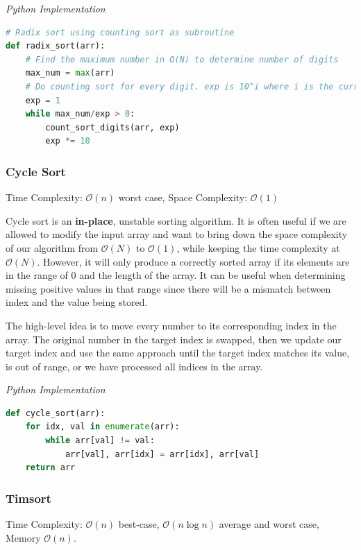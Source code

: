 \documentclass{article}
\newcommand{\bigO}{\mathcal{O}}
\begin{document}
\vspace{8pt} \emph{Python Implementation}
\begin{lstlisting}[language=Python]
# Radix sort using counting sort as subroutine
def radix_sort(arr): 
    # Find the maximum number in O(N) to determine number of digits
    max_num = max(arr) 
    # Do counting sort for every digit. exp is 10^i where i is the current digit number 
    exp = 1
    while max_num/exp > 0: 
        count_sort_digits(arr, exp) 
        exp *= 10
\end{lstlisting}
    
    \subsubsection{Cycle Sort}
    Time Complexity: $\bigO(n)$ worst case, Space Complexity: $\bigO(1)$ 
    
    Cycle sort is an \textbf{in-place}, unstable sorting algorithm. It is often useful if we are allowed to modify the input array and want to bring down the space complexity of our algorithm from $\bigO(N)$ to $\bigO(1)$, while keeping the time complexity at $\bigO(N)$. However, it will only produce a correctly sorted array if its elements are in the range of 0 and the length of the array. It can be useful when determining missing positive values in that range since there will be a mismatch between index and the value being stored.
    
    The high-level idea is to move every number to its corresponding index in the array. The original number in the target index is swapped, then we update our target index and use the same approach until the target index matches its value, is out of range, or we have processed all indices in the array.

\vspace{8pt} \emph{Python Implementation}
\begin{lstlisting}[language=Python]
def cycle_sort(arr): 
    for idx, val in enumerate(arr):                       
        while arr[val] != val: 
            arr[val], arr[idx] = arr[idx], arr[val]  
    return arr
\end{lstlisting}

    \subsubsection{Timsort}
    Time Complexity: $\bigO(n)$ best-case, $\bigO(n\log n)$  average and worst case, Memory $\bigO(n)$.
    
\end{document}
